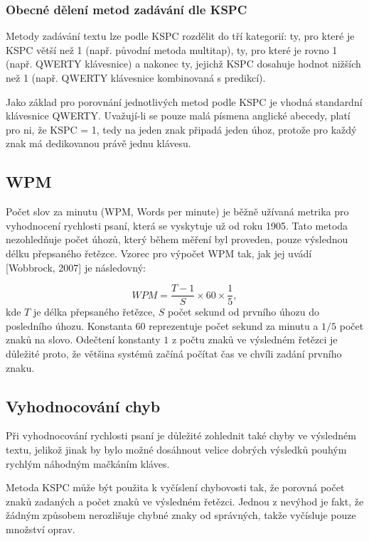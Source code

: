 \documentclass[a4paper,11pt]{article}
\begin{document}
\subsubsection{Obecné dělení metod zadávání dle KSPC}

Metody zadávání textu lze podle KSPC rozdělit do tří kategorií: ty, pro které je KSPC větší než 1 (např. původní metoda multitap), ty, pro které je rovno 1 (např. QWERTY klávesnice) a nakonec ty, jejichž KSPC dosahuje hodnot nižších než 1 (např. QWERTY klávesnice kombinovaná s predikcí). %

Jako základ pro porovnání jednotlivých metod podle KSPC je vhodná standardní klávesnice QWERTY. %
Uvažují-li se pouze malá písmena anglické abecedy, platí pro ni, že KSPC = 1, tedy na jeden znak připadá jeden úhoz, protože pro každý znak má dedikovanou právě jednu klávesu.

\subsection{WPM}

Počet slov za minutu (WPM, Words per minute) je běžně užívaná metrika pro vyhodnocení rychlosti psaní, která se vyskytuje už od roku 1905. %
Tato metoda nezohledňuje počet úhozů, který během měření byl proveden, pouze výslednou délku přepsaného řetězce. Vzorec pro výpočet WPM tak, jak jej uvádí [Wobbrock, 2007] %
je následovný:

\[
	WPM = \frac{T - 1}{S} \times 60 \times \frac{1}{5},
\]
kde $T$ je délka přepsaného řetězce, $S$ počet sekund od prvního úhozu do posledního úhozu. Konstanta $60$ reprezentuje počet sekund za minutu a $1/5$ počet znaků na slovo. Odečtení konstanty $1$ z počtu znaků ve výsledném řetězci je důležité proto, že většina systémů začíná počítat čas ve chvíli zadání prvního znaku. %

\subsection{Vyhodnocování chyb}

Při vyhodnocování rychlosti psaní je důležité zohlednit také chyby ve výsledném textu, jelikož jinak by bylo možné dosáhnout velice dobrých výsledků pouhým rychlým náhodným mačkáním kláves.

Metoda KSPC může být použita k vyčíslení chybovosti tak, že porovná počet znaků zadaných a počet znaků ve výsledném řetězci. Jednou z nevýhod je fakt, že žádným způsobem nerozlišuje chybné znaky od správných, takže vyčísluje pouze množství oprav. %
\end{document}
